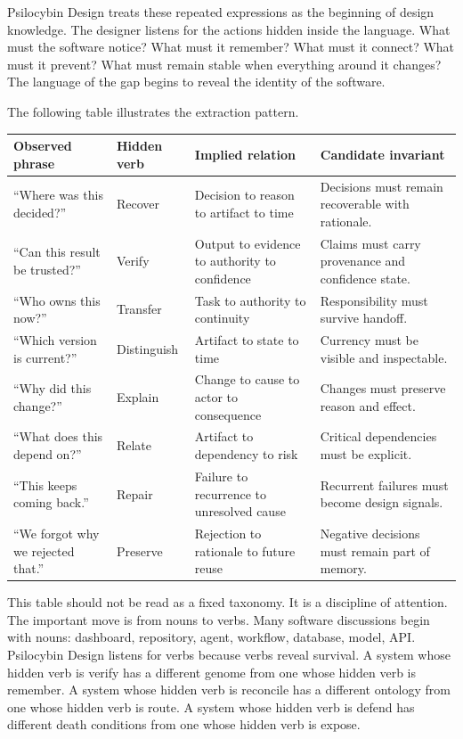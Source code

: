 \documentclass[11pt]{article}
\begin{document}
Psilocybin Design treats these repeated expressions as the beginning of design knowledge. The designer listens for the actions hidden inside the language. What must the software notice? What must it remember? What must it connect? What must it prevent? What must remain stable when everything around it changes? The language of the gap begins to reveal the identity of the software.

The following table illustrates the extraction pattern.

\begin{longtable}{|p{}|p{}|p{}|p{}|}
\hline
\textbf{Observed phrase} & \textbf{Hidden verb} & \textbf{Implied relation} & \textbf{Candidate invariant} \\
\hline
``Where was this decided?'' & Recover & Decision to reason to artifact to time & Decisions must remain recoverable with rationale. \\
\hline
``Can this result be trusted?'' & Verify & Output to evidence to authority to confidence & Claims must carry provenance and confidence state. \\
\hline
``Who owns this now?'' & Transfer & Task to authority to continuity & Responsibility must survive handoff. \\
\hline
``Which version is current?'' & Distinguish & Artifact to state to time & Currency must be visible and inspectable. \\
\hline
``Why did this change?'' & Explain & Change to cause to actor to consequence & Changes must preserve reason and effect. \\
\hline
``What does this depend on?'' & Relate & Artifact to dependency to risk & Critical dependencies must be explicit. \\
\hline
``This keeps coming back.'' & Repair & Failure to recurrence to unresolved cause & Recurrent failures must become design signals. \\
\hline
``We forgot why we rejected that.'' & Preserve & Rejection to rationale to future reuse & Negative decisions must remain part of memory. \\
\hline
\end{longtable}

This table should not be read as a fixed taxonomy. It is a discipline of attention. The important move is from nouns to verbs. Many software discussions begin with nouns: dashboard, repository, agent, workflow, database, model, API. Psilocybin Design listens for verbs because verbs reveal survival. A system whose hidden verb is verify has a different genome from one whose hidden verb is remember. A system whose hidden verb is reconcile has a different ontology from one whose hidden verb is route. A system whose hidden verb is defend has different death conditions from one whose hidden verb is expose.
\end{document}
